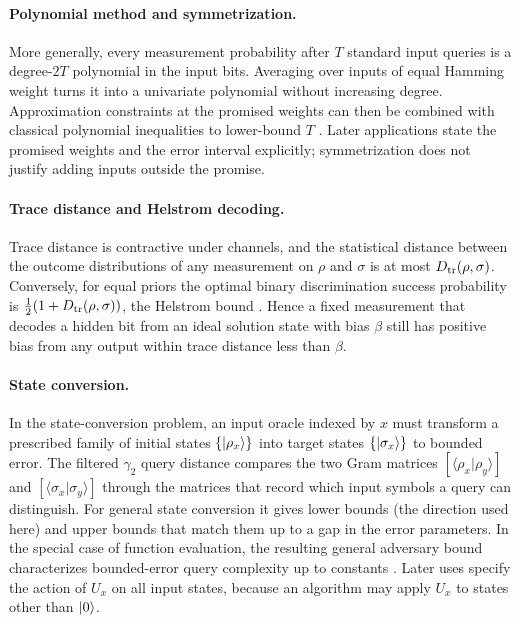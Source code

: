 \paragraph{Polynomial method and symmetrization.}
More generally, every measurement probability after $T$ standard input
queries is a degree-$2T$ polynomial in the input bits.  Averaging over inputs
of equal Hamming weight turns it into a univariate polynomial without
increasing degree.  Approximation constraints at the promised weights can
then be combined with classical polynomial inequalities to lower-bound $T$
\cite{beals2001-quantum-lower-bounds-by-polynomials}.  Later applications
state the promised weights and the error interval explicitly; symmetrization
does not justify adding inputs outside the promise.

\paragraph{Trace distance and Helstrom decoding.}
Trace distance is contractive under channels, and the statistical distance
between the outcome distributions of any measurement on $\rho$ and $\sigma$
is at most $D_{\mathrm{tr}}(\rho,\sigma)$.  Conversely, for equal priors the optimal
binary discrimination success probability is
$\tfrac12(1+D_{\mathrm{tr}}(\rho,\sigma))$, the Helstrom bound
\cite{nielsen2010-quantum-computation-quantum-information-10th}.  Hence a fixed
measurement that decodes a hidden bit from an ideal solution state with bias
$\beta$ still has positive bias from any output within trace distance less
than $\beta$.

\paragraph{State conversion.}
In the state-conversion problem, an input oracle indexed by $x$ must transform
a prescribed family of initial states $\{\lvert \rho_x\rangle\}$ into target states
$\{\lvert \sigma_x\rangle\}$ to bounded error.  The filtered $\gamma_2$ query distance
compares the two Gram matrices
$[\langle\rho_x|\rho_y\rangle]$ and
$[\langle\sigma_x|\sigma_y\rangle]$ through the matrices that record which
input symbols a query can distinguish.  For general state conversion it
gives lower bounds (the direction used here) and upper bounds that match them
up to a gap in the error parameters.  In the special case of
function evaluation, the resulting general adversary bound characterizes
bounded-error query complexity up to constants
\cite{lee2011-quantum-query-complexity-of-state}.  Later uses specify the action
of $U_x$ on all input states, because an algorithm may apply $U_x$ to states
other than $\lvert 0\rangle$.

